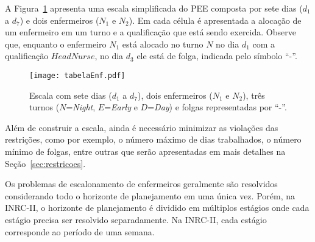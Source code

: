 \documentclass[cic,tc, twoside]{iiufrgs}
\begin{document}
A Figura~\ref{fig:escalaExemplo} apresenta uma escala simplificada do PEE composta por sete dias ($d_1$ a $d_7$) e dois enfermeiros ($N_1$ e $N_2$).
Em cada célula é apresentada a alocação de um enfermeiro em um turno e a qualificação que está sendo exercida. Observe que, enquanto o enfermeiro $N_1$ está alocado no turno $N$ no dia $d_1$ com a qualificação $HeadNurse$, no dia $d_3$ ele está de folga, indicada pelo símbolo ``-''.

\begin{figure}[H]
\texttt{[image: tabelaEnf.pdf]}
\centering
\caption{Escala com sete dias ($d_1$ a $d_7$), dois enfermeiros ($N_1$ e $N_2$), três turnos ($N$=\textit{Night}, $E$=\textit{Early} 
e $D$=\textit{Day}) e folgas representadas por ``-''.}
\label{fig:escalaExemplo}
\end{figure}

Além de construir a escala, ainda é necessário minimizar as violações das restrições, como por exemplo, o número máximo de dias trabalhados, o número mínimo de folgas, entre outras que serão apresentadas em mais detalhes na Seção~\ref{sec:restricoes}.

Os problemas de escalonamento de enfermeiros geralmente são resolvidos considerando todo o horizonte de planejamento em uma única vez. Porém, na INRC-II, o horizonte de planejamento é dividido em múltiplos estágios onde cada estágio precisa ser resolvido separadamente. Na INRC-II, cada estágio corresponde ao período de uma semana. 

\begin{comment}
Para que os parâmetros de cada semana sejam estabelecidos e as semanas anteriores possam ser consideradas na solução, essas informações são armazenadas em três diferentes arquivos de dados:

\begin{itemize}
	\item Dados do cenário: válido para todo o horizonte de planejamento, contém informações gerais sobre turnos, qualificações, enfermeiros e contratos.
	\item Dados da semana: válido apenas para o estágio atual, neste arquivo estão as preferências individuais de cada enfermeiros e os valores da cobertura.
	\item Dados do histórico: contém informações relevantes sobre atribuições do fim da semana anterior, como número de dias consecutivos trabalhados, último turno trabalhado, número de dias de folga, etc.
\end{itemize}
\end{comment}
\end{document}
